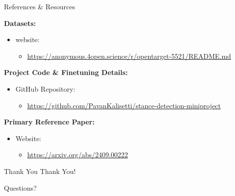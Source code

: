 \documentclass{beamer}
\begin{document}
\begin{frame}{References & Resources}
  
    \textbf{Datasets:}
  \begin{itemize}
    \item website:
          \begin{itemize}
            \item \url{https://anonymous.4open.science/r/opentarget-5521/README.md}
          \end{itemize}
  \end{itemize}
  \medskip

  \textbf{Project Code & Finetuning Details:}
  \begin{itemize}
    \item GitHub Repository:
          \begin{itemize}
            \item \url{https://github.com/PavanKalisetti/stance-detection-miniproject}
          \end{itemize}
  \end{itemize}

  \medskip

  \textbf{Primary Reference Paper: }
  \begin{itemize}
    \item Website:
          \begin{itemize}
            \item \url{https://arxiv.org/abs/2409.00222}
          \end{itemize}
  \end{itemize}
\end{frame}

\begin{frame}{Thank You}
  \centering %
  \Huge %
  Thank You!
  
  \bigskip %
  \large
  Questions?
\end{frame}
\end{document}
